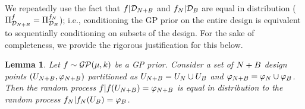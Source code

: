 \documentclass[12pt]{article}
\newtheorem{lemma}{Lemma}
\begin{document}
We repeatedly use the fact that $\func|\design[\Naugment]$ and $\funcEm[\Ndesign] | \design[\Nbatch]$ are equal in distribution 
($\emLaw[{\design[\Naugment]}]{\func} = \emLaw[{\design[\Nbatch]}]{\funcEm}$); i.e., conditioning the GP prior on the entire design 
is equivalent to sequentially conditioning on subsets of the design. For the sake of completeness, we provide the rigorous justification for this below.
\begin{lemma} \label{lemma:gp-condition-order}
Let $\func \sim \GP(\gpMeanPrior, \gpKerPrior)$ be a GP prior. Consider a set of $\Naugment$ design points $(\designIn[\Naugment], \funcVal[\Naugment])$
partitioned as $\designIn[\Naugment] = \designIn[\Ndesign] \cup \designBatchIn$ and $\funcVal[\Naugment] = \funcVal[\Ndesign] \cup \funcVal[\Nbatch]$. 
Then the random process $\func | \func(\designIn[\Naugment]) = \funcVal[\Naugment]$ is equal in distribution to the random process
$\funcEm[\Ndesign] | \funcEm[\Ndesign](\designIn[\Nbatch]) = \funcVal[\Nbatch]$. 
\end{lemma} 
\end{document}

